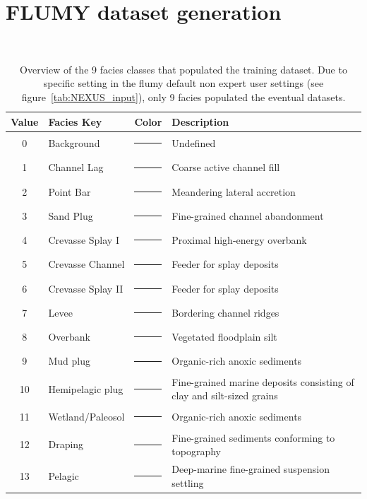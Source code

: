 \chapter{FLUMY dataset generation}
\
\begin{table}[htbp!]
    \centering
    \renewcommand{\arraystretch}{1.2}
    \begin{tabular}{c p{} l p{}}
        \hline
        \textbf{Value} & \textbf{Facies Key} & \textbf{Color} & \textbf{Description} \\
        \hline
        0 & Background & \textcolor[HTML]{FF0000}{\rule{10pt}{10pt}} & Undefined \\
        1 & Channel Lag & \textcolor[HTML]{F1970F}{\rule{10pt}{10pt}} & Coarse active channel fill \\
        2 & Point Bar & \textcolor[HTML]{F3DD12}{\rule{10pt}{10pt}} & Meandering lateral accretion \\
        3 & Sand Plug & \textcolor[HTML]{AF8F00}{\rule{10pt}{10pt}} & Fine-grained channel abandonment \\
        4 & Crevasse Splay I & \textcolor[HTML]{FFFC65}{\rule{10pt}{10pt}} & Proximal high-energy overbank \\
        5 & Crevasse Channel & \textcolor[HTML]{FFD986}{\rule{10pt}{10pt}} & Feeder for splay deposits \\
        6 & Crevasse Splay II & \textcolor[HTML]{FF9853}{\rule{10pt}{10pt}} & Feeder for splay deposits \\
        7 & Levee & \textcolor[HTML]{27AE60}{\rule{10pt}{10pt}} & Bordering channel ridges \\
        8 & Overbank & \textcolor[HTML]{33FF00}{\rule{10pt}{10pt}} & Vegetated floodplain silt \\
        9 & Mud plug & \textcolor[HTML]{FFF7DB}{\rule{10pt}{10pt}} & Organic-rich anoxic sediments \\
        10 & Hemipelagic plug & \textcolor[HTML]{7A7D80}{\rule{10pt}{10pt}} & Fine-grained marine deposits consisting of clay and silt-sized grains \\
        11 & Wetland/Paleosol & \textcolor[HTML]{D862F0}{\rule{10pt}{10pt}} & Organic-rich anoxic sediments \\
        12 & Draping & \textcolor[HTML]{8DD5E7}{\rule{10pt}{10pt}} & Fine-grained sediments conforming to topography \\
        13 & Pelagic & \textcolor[HTML]{3498DB}{\rule{10pt}{10pt}} & Deep-marine fine-grained suspension settling \\
        \hline
    \end{tabular}
    \caption{Overview of the 9 facies classes that populated the training dataset. Due to specific setting in the flumy default non expert user settings (see figure~\ref{tab:NEXUS_input}), only 9 facies populated the eventual datasets.}\label{tab:appendix_facies_config_overview}
\end{table}

